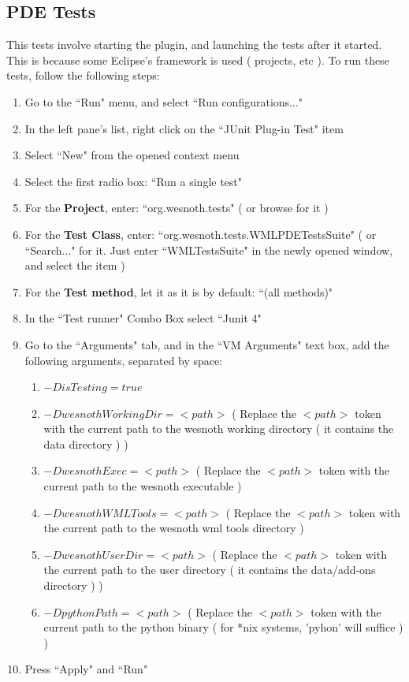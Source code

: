 \documentclass[10pt]{article}
\begin{document}
\subsection{PDE Tests}
This tests involve starting the plugin, and launching the tests after it started. This is because some Eclipse's framework is used ( projects, etc ). To run these tests, follow the following steps:
\begin{enumerate}
	\item Go to the ``Run" menu, and select ``Run configurations..."
	\item In the left pane's list, right click on the ``JUnit Plug-in Test" item
	\item Select ``New" from the opened context menu
	\item Select the first radio box: ``Run a single test"
	\item For the \textbf{Project}, enter: ``org.wesnoth.tests" ( or browse for it )
	\item For the \textbf{Test Class}, enter: ``org.wesnoth.tests.WMLPDETestsSuite" ( or ``Search..." for it. Just enter ``WMLTestsSuite" in the newly opened window, and select the item )
	\item For the \textbf{Test method}, let it as it is by default: ``(all methods)"
	\item In the ``Test runner" Combo Box select ``Junit 4"
	\item Go to the ``Arguments" tab, and in the ``VM Arguments" text box, add the following arguments, separated by space:
	\begin{enumerate}
		\item $-DisTesting=true$
		\item $-DwesnothWorkingDir=<path>$ ( Replace the $<path>$ token with the current path to the wesnoth working directory ( it contains the data directory ) )
		\item $-DwesnothExec=<path>$ ( Replace the $<path>$ token with the current path to the wesnoth executable )
		\item $-DwesnothWMLTools=<path>$ ( Replace the $<path>$ token with the current path to the wesnoth wml tools directory )
		\item $-DwesnothUserDir=<path>$ ( Replace the $<path>$ token with the current path to the user directory ( it contains the data/add-ons directory ) )
		\item $-DpythonPath=<path>$ ( Replace the $<path>$ token with the current path to the python binary ( for *nix systems, 'pyhon' will suffice ) )
	\end{enumerate}
	\item Press ``Apply" and ``Run"
\end{enumerate}
\end{document}
